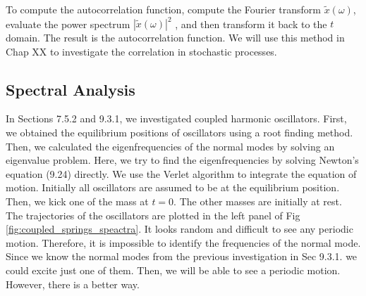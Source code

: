 To compute the autocorrelation function, compute the Fourier transform $\tilde{x}(\omega)$, evaluate the power spectrum $|\tilde{x}(\omega)|^2$ , and then transform it back to the $t$ domain. The result is the autocorrelation function.
We will use this method in Chap XX to investigate the correlation in stochastic processes.

\subsection{Spectral Analysis}

In Sections 7.5.2 and 9.3.1, we investigated coupled harmonic oscillators.  First, we obtained the equilibrium positions of oscillators using a root finding method. Then, we calculated the eigenfrequencies of the normal modes by solving an eigenvalue problem.  Here, we try to find the eigenfrequencies by solving Newton's equation (9.24) directly. We use the Verlet algorithm to integrate the equation of motion. Initially all oscillators are assumed to be at the equilibrium position. Then, we kick one of the mass at $t=0$.  The other masses are initially at rest.  The trajectories of the oscillators are plotted in the left panel of Fig \ref{fig:coupled_springs_speactra}.  It looks random and difficult to see any periodic motion.  Therefore, it is impossible to identify the frequencies of the normal mode.  Since we know the normal modes from the previous investigation in Sec 9.3.1.  we could excite just one of them.  Then, we will be able to see a periodic motion.  However, there is a better way.

